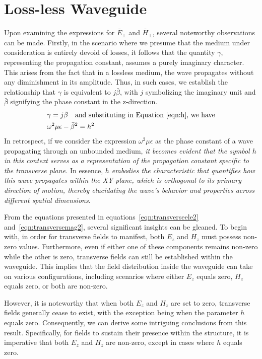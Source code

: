 \section{Loss-less Waveguide}
Upon examining the expressions for $\bar{E}_\bot$ and $\bar{H}_\bot$, several noteworthy observations can be made. Firstly, in the scenario where we presume that the medium under consideration is entirely devoid of losses, it follows that the quantity $\gamma$, representing the propagation constant, assumes a purely imaginary character. This arises from the fact that in a lossless medium, the wave propagates without any diminishment in its amplitude. Thus, in such cases, we establish the relationship that $\gamma$ is equivalent to $j\bar{\beta}$, with $j$ symbolizing the imaginary unit and $\bar{\beta}$ signifying the phase constant in the z-direction.
\begin{align*}
&\gamma = j\bar{\beta}\quad\text{and substituting in Equation~\ref{eqn:h}, we have}\\
&\omega^2\mu\epsilon - \bar{\beta}^2 = h^2
\end{align*}
In retrospect, if we consider the expression $\omega^2\mu\epsilon$ as the phase constant of a wave propagating through an unbounded medium, \emph{it becomes evident that the symbol $h$ in this context serves as a representation of the propagation constant specific to the transverse plane.} In essence, \emph{$h$ embodies the characteristic that quantifies how this wave propagates within the XY-plane, which is orthogonal to its primary direction of motion, thereby elucidating the wave's behavior and properties across different spatial dimensions}.

From the equations presented in equations~\eqref{eqn:transverseele2} and~\eqref{eqn:transversemag2}, several significant insights can be gleaned. To begin with, in order for transverse fields to manifest, both $E_z$ and $H_z$ must possess non-zero values. Furthermore, even if either one of these components remains non-zero while the other is zero, transverse fields can still be established within the waveguide. This implies that the field distribution inside the waveguide can take on various configurations, including scenarios where either $E_z$ equals zero, $H_z$ equals zero, or both are non-zero.

However, it is noteworthy that when both $E_z$ and $H_z$ are set to zero, transverse fields generally cease to exist, with the exception being when the parameter $h$ equals zero. Consequently, we can derive some intriguing conclusions from this result. Specifically, for fields to sustain their presence within the structure, it is imperative that both $E_z$ and $H_z$ are non-zero, except in cases where $h$ equals zero.

